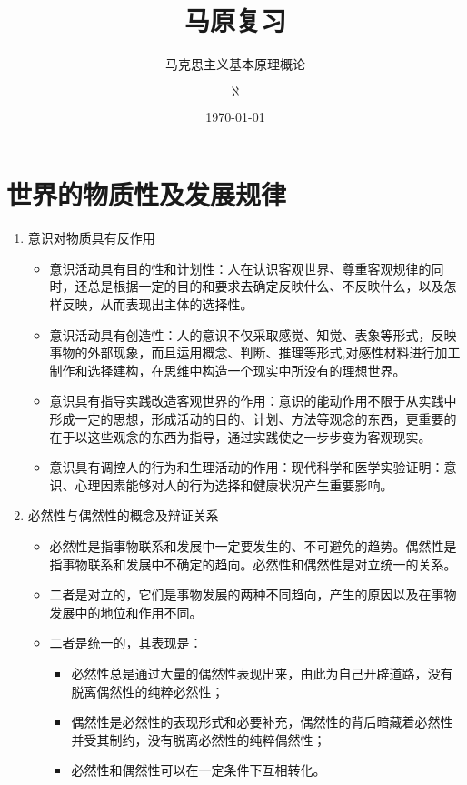\documentclass[device=pad,lang=cn,UTF8]{elegantbook}
\title{马原复习}
\subtitle{马克思主义基本原理概论}
\author{$\aleph$}
\institute{Jiang Xi Science and Technology University}
\date{\today}
\begin{document}
    \maketitle
    \tableofcontents
    \mainmatter
    \hypersetup{pageanchor=true}
    \chapter{世界的物质性及发展规律}
    \begin{enumerate}
        \item 意识对物质具有反作用
        \begin{itemize}
            \item 意识活动具有目的性和计划性：人在认识客观世界、尊重客观规律的同时，还总是根据一定的目的和要求去确定反映什么、不反映什么，以及怎样反映，从而表现出主体的选择性。
            \item 意识活动具有创造性：人的意识不仅采取感觉、知觉、表象等形式，反映事物的外部现象，而且运用概念、判断、推理等形式,对感性材料进行加工制作和选择建构，在思维中构造一个现实中所没有的理想世界。
            \item 意识具有指导实践改造客观世界的作用：意识的能动作用不限于从实践中形成一定的思想，形成活动的目的、计划、方法等观念的东西，更重要的在于以这些观念的东西为指导，通过实践使之一步步变为客观现实。
            \item 意识具有调控人的行为和生理活动的作用：现代科学和医学实验证明：意识、心理因素能够对人的行为选择和健康状况产生重要影响。
        \end{itemize}
        \item 必然性与偶然性的概念及辩证关系
        \begin{itemize}
            \item 必然性是指事物联系和发展中一定要发生的、不可避免的趋势。偶然性是指事物联系和发展中不确定的趋向。必然性和偶然性是对立统一的关系。
            \item 二者是对立的，它们是事物发展的两种不同趋向，产生的原因以及在事物发展中的地位和作用不同。
            \item 二者是统一的，其表现是：
            \begin{itemize}
                \item 必然性总是通过大量的偶然性表现出来，由此为自己开辟道路，没有脱离偶然性的纯粹必然性；
                \item 偶然性是必然性的表现形式和必要补充，偶然性的背后暗藏着必然性并受其制约，没有脱离必然性的纯粹偶然性；
                \item 必然性和偶然性可以在一定条件下互相转化。

\end{itemize}
\end{itemize}
\end{enumerate}
\end{document}
